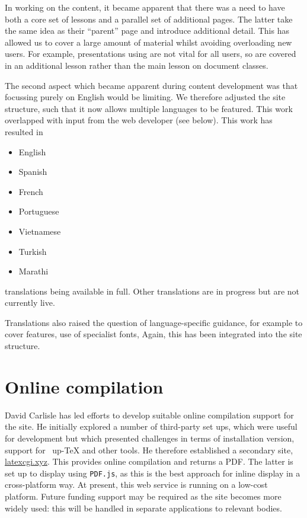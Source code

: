 \documentclass[a4paper]{article}
\begin{document}
In working on the content, it became apparent that there was a need to have
both a core set of lessons and a parallel set of additional pages. The latter
take the same idea as their \enquote{parent} page and introduce additional
detail. This has allowed us to cover a large amount of material whilst avoiding
overloading new users. For example, presentations using  are not
vital for all users, so are covered in an additional lesson rather than
the main lesson on document classes.

The second aspect which became apparent during content development was that
focussing purely on English would be limiting. We therefore adjusted the site
structure, such that it now allows multiple languages to be featured. This work
overlapped with input from the web developer (see below). This work has
resulted in
\begin{itemize}
  \item English
  \item Spanish
  \item French
  \item Portuguese
  \item Vietnamese
  \item Turkish
  \item Marathi
\end{itemize}
translations being available in full. Other translations are in progress but
are not currently live.

Translations also raised the question of language-specific guidance, for
example to cover  features, use of specialist fonts, 
Again, this has been integrated into the site structure.

\section{Online compilation}

David Carlisle has led efforts to develop suitable online compilation support
for the site. He initially explored a number of third-party set ups, which were
useful for development but which presented challenges in terms of installation
version, support for ~up-\TeX{} and other tools. He therefore
established a secondary site, \url{latexcgi.xyz}. This provides online
compilation and returns a PDF. The latter is set up to display using
\texttt{PDF.js}, as this is the best approach for inline display in a
cross-platform way. At present, this web service is running on a low-cost
platform. Future funding support may be required as the site becomes more
widely used: this will be handled in separate applications to relevant bodies.
\end{document}
